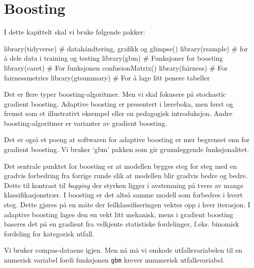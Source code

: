 \documentclass[
  letterpaper,
  DIV=11,
  numbers=noendperiod]{scrreprt}
\newenvironment{Shaded}{\begin{snugshade}}{\end{snugshade}}
\newcommand{\CommentTok}[1]{\textcolor[rgb]{0.37,0.37,0.37}{#1}}
\newcommand{\FunctionTok}[1]{\textcolor[rgb]{0.28,0.35,0.67}{#1}}
\newcommand{\NormalTok}[1]{\textcolor[rgb]{0.00,0.23,0.31}{#1}}
\begin{document}

\chapter{Boosting}\label{boosting}

I dette kapittelt skal vi bruke følgende pakker:

\begin{Shaded}
\begin{Highlighting}[]
\FunctionTok{library}\NormalTok{(tidyverse)   }\CommentTok{\# datahåndtering, grafikk og glimpse()}
\FunctionTok{library}\NormalTok{(rsample)     }\CommentTok{\# for å dele data i training og testing}
\FunctionTok{library}\NormalTok{(gbm)         }\CommentTok{\# Funksjoner for boosting }
\FunctionTok{library}\NormalTok{(caret)       }\CommentTok{\# For funksjonen confusionMatrix()}
\FunctionTok{library}\NormalTok{(fairness)    }\CommentTok{\# For fairnessmetrics }
\FunctionTok{library}\NormalTok{(gtsummary)   }\CommentTok{\# For å lage litt penere tabeller}
\end{Highlighting}
\end{Shaded}

Det er flere typer boosting-algoritmer. Men vi skal fokusere på
stochastic gradient boosting. Adaptive boosting er presentert i
læreboka, men først og fremst som et illustrativt eksempel eller en
pedagogisk introduksjon. Andre boosting-algoritmer er varianter av
gradient boosting.

Det er også et poeng at softwaren for adaptive boosting er mer begrenset
enn for gradient boosting. Vi bruker `gbm' pakken som gir grunnleggende
funksjonalitet.

Det sentrale punktet for boosting er at modellen bygges steg for steg
med en gradvis forbedring fra forrige runde slik at modellen blir
gradvis bedre og bedre. Dette til kontrast til \emph{bagging} der
styrken ligger i avstemning på tvers av mange klassifikasjonstrær. I
boosting er det altså samme modell som forbedres i hvert steg. Dette
gjøres på en måte der feilklassifiseringen vektes opp i hver iterasjon.
I adaptive boosting lages den en vekt litt mekanisk, mens i gradient
boosting baseres det på en gradient fra velkjente statistiske
fordelinger, f.eks. binomisk fordeling for kategorisk utfall.

Vi bruker compas-dataene igjen. Men nå må vi omkode utfallsvariabelen
til en numerisk variabel fordi funksjonen \texttt{gbm} krever nummerisk
utfallsvariabel.
\end{document}
